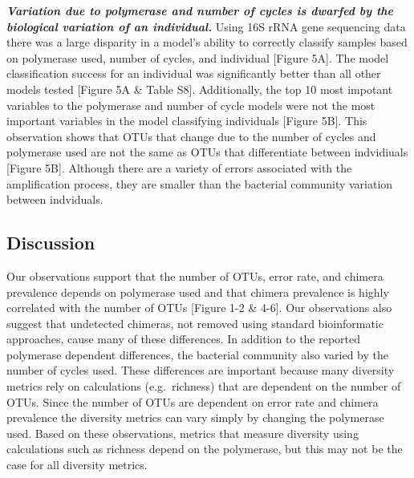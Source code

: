\documentclass[11pt,]{article}
\begin{document}
\textbf{\emph{Variation due to polymerase and number of cycles is
dwarfed by the biological variation of an individual.}} Using 16S rRNA
gene sequencing data there was a large disparity in a model's ability to
correctly classify samples based on polymerase used, number of cycles,
and individual {[}Figure 5A{]}. The model classification success for an
individual was significantly better than all other models tested
{[}Figure 5A \& Table S8{]}. Additionally, the top 10 most impotant
variables to the polymerase and number of cycle models were not the most
important variables in the model classifying individuals {[}Figure
5B{]}. This observation shows that OTUs that change due to the number of
cycles and polymerase used are not the same as OTUs that differentiate
between indvidiuals {[}Figure 5B{]}. Although there are a variety of
errors associated with the amplification process, they are smaller than
the bacterial community variation between indviduals.

\newpage

\subsection{Discussion}\label{discussion}

Our observations support that the number of OTUs, error rate, and
chimera prevalence depends on polymerase used and that chimera
prevalence is highly correlated with the number of OTUs {[}Figure 1-2 \&
4-6{]}. Our observations also suggest that undetected chimeras, not
removed using standard bioinformatic approaches, cause many of these
differences. In addition to the reported polymerase dependent
differences, the bacterial community also varied by the number of cycles
used. These differences are important because many diversity metrics
rely on calculations (e.g.~richness) that are dependent on the number of
OTUs. Since the number of OTUs are dependent on error rate and chimera
prevalence the diversity metrics can vary simply by changing the
polymerase used. Based on these observations, metrics that measure
diversity using calculations such as richness depend on the polymerase,
but this may not be the case for all diversity metrics.
\end{document}
